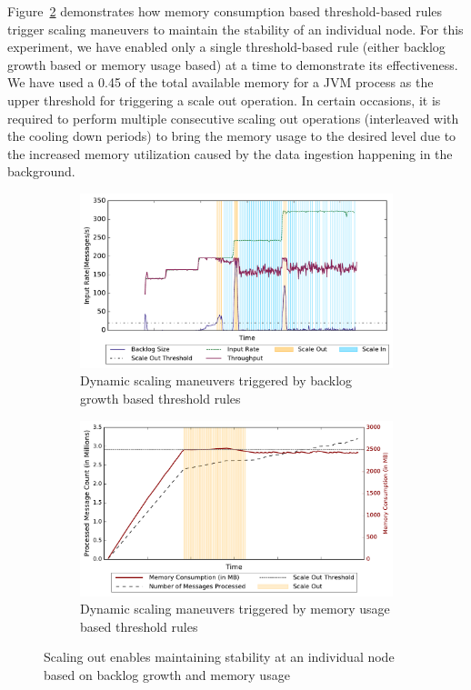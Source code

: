 Figure~\ref{fig:stability-mem} demonstrates how memory consumption based threshold-based rules trigger scaling maneuvers to maintain the stability of an individual node.
For this experiment, we have enabled only a single threshold-based rule (either backlog growth based or memory usage based) at a time to demonstrate its effectiveness.
We have used a 0.45 of the total available memory for a JVM process as the upper threshold for triggering a scale out operation.
In certain occasions, it is required to perform multiple consecutive scaling out operations (interleaved with the cooling down periods) to bring the memory usage to the desired level due to the increased memory utilization caused by the data ingestion happening in the background.
\begin{figure}[h!]
    \begin{subfigure}{0.48\textwidth}
            \centering
            \includegraphics[scale=0.42]{figures/stability_partial.pdf}
            \caption{Dynamic scaling maneuvers triggered by backlog growth based threshold rules}
            \label{fig:stability-backlog}
    \end{subfigure}
    \begin{subfigure}{0.48\textwidth}
            \centering
            \includegraphics[scale=0.42]{figures//mem_stability.pdf} 
            \caption{Dynamic scaling maneuvers triggered by memory usage based threshold rules}
            \label{fig:stability-mem}
    \end{subfigure}
    \caption{Scaling out enables maintaining stability at an individual node based on backlog growth and memory usage}
    \label{fig:system-stability}
\end{figure}

